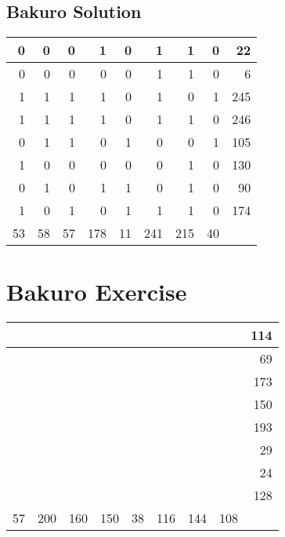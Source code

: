 \documentclass[]{article}
\begin{document}
 \subsection{Bakuro Solution} 
\begin{tabular}{rrrrrrrrr}
\hline
  0 &  0 &  0 &   1 &  0 &   1 &   1 &  0 &  22 \\ \hline
  0 &  0 &  0 &   0 &  0 &   1 &   1 &  0 &   6 \\ \hline
  1 &  1 &  1 &   1 &  0 &   1 &   0 &  1 & 245 \\ \hline
  1 &  1 &  1 &   1 &  0 &   1 &   1 &  0 & 246 \\ \hline
  0 &  1 &  1 &   0 &  1 &   0 &   0 &  1 & 105 \\ \hline
  1 &  0 &  0 &   0 &  0 &   0 &   1 &  0 & 130 \\ \hline
  0 &  1 &  0 &   1 &  1 &   0 &   1 &  0 &  90 \\ \hline
  1 &  0 &  1 &   0 &  1 &   1 &   1 &  0 & 174 \\ \hline
 53 & 58 & 57 & 178 & 11 & 241 & 215 & 40 &     \\ \hline
\hline
\end{tabular}\newpage\section{Bakuro Exercise}\begin{tabular}{rrrrrrrrr}
\hline
    &     &     &     &    &     &     &     & 114 \\ \hline
    &     &     &     &    &     &     &     &  69 \\ \hline
    &     &     &     &    &     &     &     & 173 \\ \hline
    &     &     &     &    &     &     &     & 150 \\ \hline
    &     &     &     &    &     &     &     & 193 \\ \hline
    &     &     &     &    &     &     &     &  29 \\ \hline
    &     &     &     &    &     &     &     &  24 \\ \hline
    &     &     &     &    &     &     &     & 128 \\ \hline
 57 & 200 & 160 & 150 & 38 & 116 & 144 & 108 &     \\ \hline
\hline
\end{tabular}\newpage 
\end{document}
